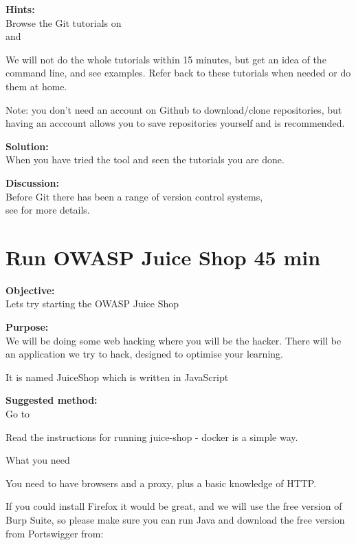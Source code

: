 \documentclass[a4paper,11pt,notitlepage]{report}
\begin{document}
{\bf Hints:}\\
Browse the Git tutorials on \\
and 

We will not do the whole tutorials within 15 minutes, but get an idea of the command line, and see examples. Refer back to these tutorials when needed or do them at home.

Note: you don't need an account on Github to download/clone repositories, but having an acccount allows you to save repositories yourself and is recommended.

{\bf Solution:}\\
When you have tried the tool and seen the tutorials you are done.

{\bf Discussion:}\\
Before Git there has been a range of version control systems,\\
see  for more details.




\chapter{Run OWASP Juice Shop 45 min}
\label{ex:sw-startjuice}


{\bf Objective:}\\
Lets try starting the OWASP Juice Shop

{\bf Purpose:}\\
We will be doing some web hacking where you will be the hacker. There
will be an application we try to hack, designed to
optimise your learning.

It is named JuiceShop which is written in JavaScript

{\bf Suggested method:}\\
Go to 

Read the instructions for running juice-shop - docker is a simple way.

What you need

You need to have browsers and a proxy, plus a basic knowledge of HTTP.

If you could install Firefox it would be great, and we will use the
free version of Burp Suite, so please make sure you can run Java and
download the free version from Portswigger from:
\end{document}
